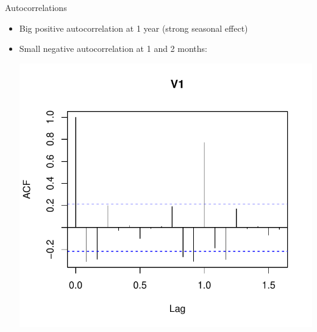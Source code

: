 \begin{frame}[fragile]{Autocorrelations}
  
  \begin{itemize}
\item Big positive autocorrelation at 1 year (strong seasonal effect)
\item Small negative autocorrelation at 1 and 2 months:
  
\begin{knitrout}
\color{fgcolor}\begin{kframe}
\begin{alltt}
\end{alltt}
\end{kframe}
\includegraphics[width=\maxwidth]{figure/asjdhasjhsajkhdaskjhd-1} 

\end{knitrout}
  \end{itemize}
  
\end{frame}


